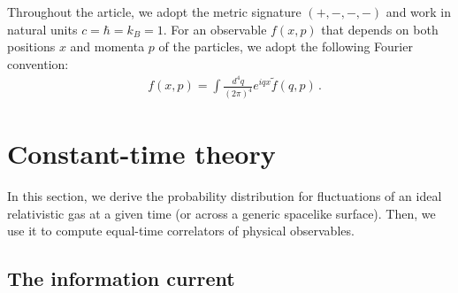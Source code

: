 \documentclass[aps,prd,preprint,nofootinbib,amsmath,amssymb,showpacs,longbibliography,singlecolumn,superscriptaddress,10pt]{revtex4-1}
\theoremstyle{plain}
\theoremstyle{definition}
\begin{document}
Throughout the article, we adopt the metric signature $(+,-,-,-)$ and work in natural units $c=\hbar=k_B=1$. For an observable $f(x,p)$ that depends on both positions $x$ and momenta $p$ of the particles, we adopt the following Fourier convention:
\begin{equation}
\begin{aligned}
 &
 f(x,p) = \int \frac{d^{4}q}{(2 \pi)^{4}} e^{i q x} \widetilde{f}(q,p) \, .
\end{aligned}    
\end{equation}


\section{Constant-time theory}

In this section, we derive the probability distribution for fluctuations of an ideal relativistic gas at a given time (or across a generic spacelike surface). Then, we use it to compute equal-time correlators of physical observables.

\subsection{The information current}
\label{sec:info-current}
\end{document}
